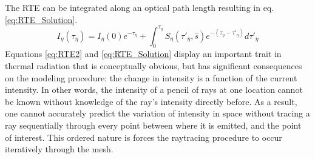 The RTE can be integrated along an optical path length resulting in eq. \ref{eq:RTE_Solution}.
\begin{equation}
    I_\eta{}(\tau{}_\eta{}) = I_\eta{}(0)e^{-\tau{}_\eta{}}+\int_{0}^{\tau{}_\eta{}}{S_\eta{}(\tau{}'_\eta{},\hat{s})e^{-(\tau{}_\eta{}-\tau{}'_\eta{})}}d\tau{}'_\eta{}
    \label{eq:RTE_Solution}
\end{equation}
Equations \ref{eq:RTE2} and \ref{eq:RTE_Solution} display an important trait in thermal radiation that is conceptually obvious, but has significant consequences on the modeling procedure:
the change in intensity is a function of the current intensity. In other words, the intensity of a pencil of rays at one location cannot be known without knowledge of the ray's intensity directly before.
As a result, one cannot accurately predict the variation of intensity in space without tracing a ray sequentially through every point between where it is emitted, and the point of interest.
This ordered nature is forces the raytracing procedure to occur iteratively through the mesh.

